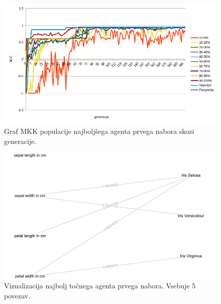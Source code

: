 \begin{figure}[H]
    \begin{center}
        \includegraphics[width=13cm]{iris/1/mcc}
    \end{center}
    \caption{Graf MKK populacije najboljšega agenta prvega nabora skozi generacije.}
    \label{fig:iris_mcc_1}
\end{figure}

\begin{figure}[H]
    \begin{center}
        \includegraphics[width=13cm]{iris/1/acc_g}
    \end{center}
    \caption{Vizualizacija najbolj točnega agenta prvega nabora. Vsebuje 5 povezav.}
    \label{fig:iris_acc_1_g}
\end{figure}

